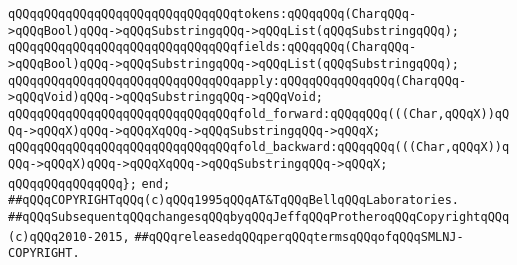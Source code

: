 \verb|qQQqqQQqqQQqqQQqqQQqqQQqqQQqqQQqtokens:qQQqqQQq(CharqQQq->qQQqBool)qQQq->qQQqSubstringqQQq->qQQqList(qQQqSubstringqQQq);|\newline
\verb|qQQqqQQqqQQqqQQqqQQqqQQqqQQqqQQqfields:qQQqqQQq(CharqQQq->qQQqBool)qQQq->qQQqSubstringqQQq->qQQqList(qQQqSubstringqQQq);|\newline
\newline
\verb|qQQqqQQqqQQqqQQqqQQqqQQqqQQqqQQqapply:qQQqqQQqqQQqqQQq(CharqQQq->qQQqVoid)qQQq->qQQqSubstringqQQq->qQQqVoid;|\newline
\verb|qQQqqQQqqQQqqQQqqQQqqQQqqQQqqQQqfold_forward:qQQqqQQq(((Char,qQQqX))qQQq->qQQqX)qQQq->qQQqXqQQq->qQQqSubstringqQQq->qQQqX;|\newline
\verb|qQQqqQQqqQQqqQQqqQQqqQQqqQQqqQQqfold_backward:qQQqqQQq(((Char,qQQqX))qQQq->qQQqX)qQQq->qQQqXqQQq->qQQqSubstringqQQq->qQQqX;|\newline
\newline
\verb|qQQqqQQqqQQqqQQq};|\newline
\verb|end;|\newline
\newline
\newline
\verb|##qQQqCOPYRIGHTqQQq(c)qQQq1995qQQqAT&TqQQqBellqQQqLaboratories.|\newline
\verb|##qQQqSubsequentqQQqchangesqQQqbyqQQqJeffqQQqProtheroqQQqCopyrightqQQq(c)qQQq2010-2015,|\newline
\verb|##qQQqreleasedqQQqperqQQqtermsqQQqofqQQqSMLNJ-COPYRIGHT.|\newline

